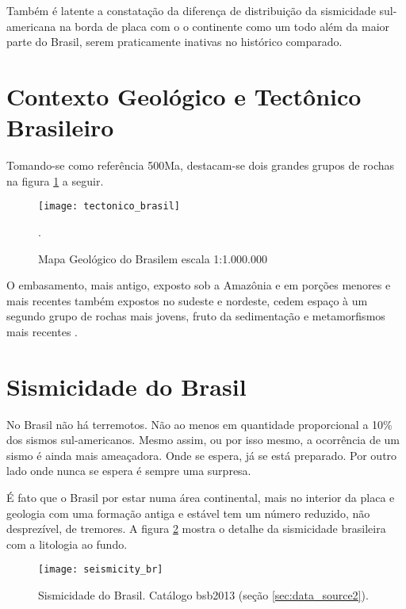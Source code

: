 Também é latente a constatação da diferença de distribuição da sismicidade sul-americana na borda de placa com o
o continente como um todo além da maior parte do Brasil, serem praticamente inativas no histórico comparado.

\section{Contexto Geológico e Tectônico Brasileiro}
\label{sec:geotec_bras}

Tomando-se como referência 500Ma, destacam-se dois grandes grupos de rochas na figura \ref{fig:br_tec} a seguir.

\begin{figure}[H]
  \centering
  \texttt{[image: tectonico\_brasil]} 
  \caption{Mapa Geológico do Brasil\footnotemark em escala 1:1.000.000}.
  \label{fig:br_tec} 
\end{figure}

O embasamento, mais antigo, exposto sob a Amazônia e em porções menores e mais recentes também expostos 
no sudeste e nordeste, cedem espaço à um segundo grupo de rochas mais jovens, fruto da sedimentação e metamorfismos
mais recentes \citep{bizzi_2003}.


\section{Sismicidade do Brasil}
\label{sec:sismicidade_brasil}

No Brasil não há terremotos. Não ao menos em quantidade proporcional a 10\% dos sismos sul-americanos.
Mesmo assim, ou por isso mesmo, a ocorrência de um sismo é ainda mais ameaçadora. Onde se espera, 
já se está preparado. Por outro lado onde nunca se espera é sempre uma surpresa.

É fato que o Brasil por estar numa área continental, mais no interior da placa \citep{talwani_2014} e geologia
com uma formação antiga e estável tem um número reduzido, não desprezível, de tremores. 
A figura \ref{fig:br_seis} mostra o detalhe da sismicidade brasileira com a litologia ao fundo.


\begin{figure}[H]
  \centering
  \texttt{[image: seismicity\_br]} 
  \caption{Sismicidade do Brasil. Catálogo \gls{bsb2013} (seção \ref{sec:data_source2}).}
  \label{fig:br_seis} 
\end{figure}

